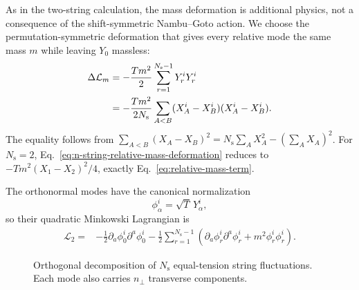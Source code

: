 As in the two-string calculation, the mass deformation is additional physics,
not a consequence of the shift-symmetric Nambu--Goto action.  We choose the
permutation-symmetric deformation that gives every relative mode the same mass
$m$ while leaving $Y_0$ massless:
\begin{align}
  \Delta\mathcal L_m
  &=-\frac{Tm^2}{2}\sum_{r=1}^{N_{\mathrm s}-1}Y_r^iY_r^i
  \notag\\
  &=-\frac{Tm^2}{2N_{\mathrm s}}
    \sum_{A<B}(X_A^i-X_B^i)(X_A^i-X_B^i).
  \label{eq:n-string-relative-mass-deformation}
\end{align}
The equality follows from
$\sum_{A<B}(X_A-X_B)^2=N_{\mathrm s}\sum_AX_A^2-(\sum_AX_A)^2$.
For $N_{\mathrm s}=2$, Eq.~\eqref{eq:n-string-relative-mass-deformation}
reduces to $-Tm^2(X_1-X_2)^2/4$, exactly
Eq.~\eqref{eq:relative-mass-term}.

The orthonormal modes have the canonical normalization
\begin{equation}
  \phi_\alpha^i=\sqrt{T}\,Y_\alpha^i,
  \label{eq:n-string-canonical-fields}
\end{equation}
so their quadratic Minkowski Lagrangian is
\begin{align}
  \mathcal L_2={}&-\frac12\partial_a\phi_0^i\partial^a\phi_0^i
  -\frac12\sum_{r=1}^{N_{\mathrm s}-1}
    \left(\partial_a\phi_r^i\partial^a\phi_r^i
          +m^2\phi_r^i\phi_r^i\right).
  \label{eq:n-string-quadratic-canonical}
\end{align}

\begin{figure}[h!]
  \centering
  \caption{Orthogonal decomposition of $N_{\mathrm s}$ equal-tension string
  fluctuations.  Each mode also carries $n_\perp$ transverse components.}
  \label{fig:n-string-mode-decomposition}
\end{figure}

